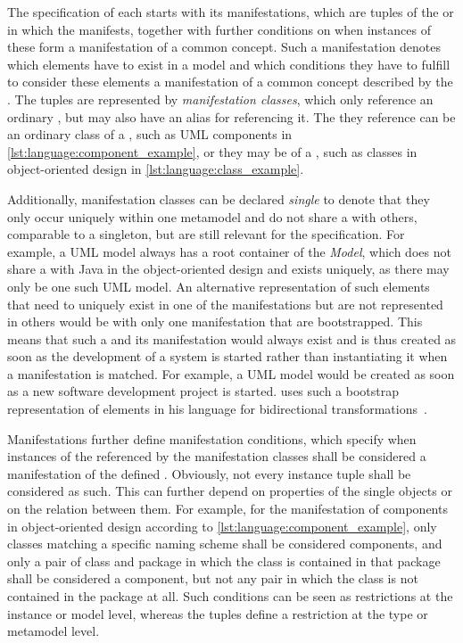 The specification of each \commonality starts with its manifestations, which are \metaclass tuples of the \concretemetamodels or \conceptmetamodels in which the \commonality manifests, together with further conditions on when instances of these \metaclasses form a manifestation of a common concept.
Such a manifestation denotes which elements have to exist in a model and which conditions they have to fulfill to consider these elements a manifestation of a common concept described by the \commonality.
The \metaclass tuples are represented by \emph{manifestation classes}, which only reference an ordinary \metaclass, but may also have an alias for referencing it.
The \metaclass they reference can be an ordinary class of a \concretemetamodels, such as \gls{UML} components in \autoref{lst:language:component_example}, or they may be \commonalities of a \conceptmetamodel, such as classes in object-oriented design in \autoref{lst:language:class_example}.

Additionally, manifestation classes can be declared \emph{single} to denote that they only occur uniquely within one metamodel and do not share a \commonality with others, comparable to a singleton, but are still relevant for the \commonalities specification.
For example, a \gls{UML} model always has a root container of the \metaclass \emph{Model}, which does not share a \commonality with Java in the object-oriented design \conceptmetamodel and exists uniquely, as there may only be one such \gls{UML} model.
An alternative representation of such elements that need to uniquely exist in one of the manifestations but are not represented in others would be \commonalities with only one manifestation that are bootstrapped.
This means that such a \commonality and its manifestation would always exist and is thus created as soon as the development of a system is started rather than instantiating it when a manifestation is matched.
For example, a \gls{UML} model would be created as soon as a new software development project is started.
\citeauthor{kramer2017a} uses such a bootstrap representation of elements in his \mappings language for bidirectional transformations~\cite[Sec.~7.1]{kramer2017a}.

Manifestations further define manifestation conditions, which specify when instances of the \metaclasses referenced by the manifestation classes shall be considered a manifestation of the defined \commonality.
Obviously, not every instance tuple shall be considered as such.
This can further depend on properties of the single objects or on the relation between them.
For example, for the manifestation of components in object-oriented design according to \autoref{lst:language:component_example}, only classes matching a specific naming scheme shall be considered components, and only a pair of class and package in which the class is contained in that package shall be considered a component, but not any pair in which the class is not contained in the package at all.
Such conditions can be seen as restrictions at the instance or model level, whereas the \metaclass tuples define a restriction at the type or metamodel level.

